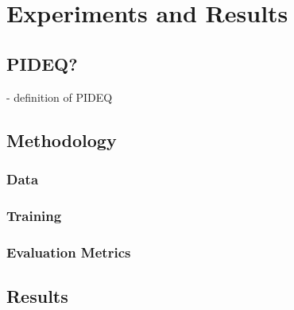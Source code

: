 \chapter{Experiments and Results}

\section{PIDEQ?}

- definition of PIDEQ

\section{Methodology}

\subsection{Data}

\subsection{Training}

\subsection{Evaluation Metrics}

\section{Results}
